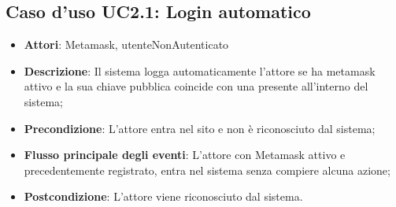 \subsection{Caso d'uso \texorpdfstring{UC2.1}{UC2.1}: Login automatico}
\begin{itemize}
\item \textbf{Attori}: Metamask, utenteNonAutenticato
\item \textbf{Descrizione}: Il sistema logga automaticamente l'attore se ha metamask attivo e la sua chiave pubblica coincide con una presente all'interno del sistema;
\item \textbf{Precondizione}: L'attore entra nel sito e non è riconosciuto dal sistema;
\item \textbf{Flusso principale degli eventi}: L'attore con Metamask attivo e precedentemente registrato, entra nel sistema senza compiere alcuna azione;
\item \textbf{Postcondizione}: L'attore viene riconosciuto dal sistema.
\end{itemize}
